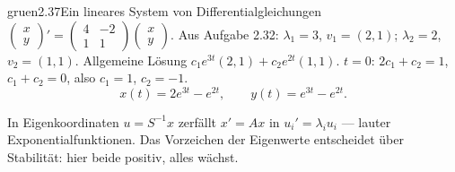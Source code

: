 \begin{loesungkarte}{gruen}{2.37}{Ein lineares System von Differentialgleichungen}
$\begin{pmatrix}x\\ y\end{pmatrix}' = \begin{pmatrix}4 & -2\\ 1 & 1\end{pmatrix}\begin{pmatrix}x\\ y\end{pmatrix}$. Aus Aufgabe 2.32: $\lambda_1 = 3$, $v_1 = (2, 1)$; $\lambda_2 = 2$, $v_2 = (1, 1)$. Allgemeine Lösung $c_1e^{3t}(2, 1) + c_2e^{2t}(1, 1)$.
$t = 0$: $2c_1 + c_2 = 1$, $c_1 + c_2 = 0$, also $c_1 = 1$, $c_2 = -1$.
\[ x(t) = 2e^{3t} - e^{2t},\qquad y(t) = e^{3t} - e^{2t}. \]
\begin{mitnehmen}\kastentext
In Eigenkoordinaten $u = S^{-1}x$ zerfällt $x' = Ax$ in $u_i' = \lambda_iu_i$ --- lauter Exponentialfunktionen. Das Vorzeichen der Eigenwerte entscheidet über Stabilität: hier beide positiv, alles wächst.
\end{mitnehmen}
\end{loesungkarte}

